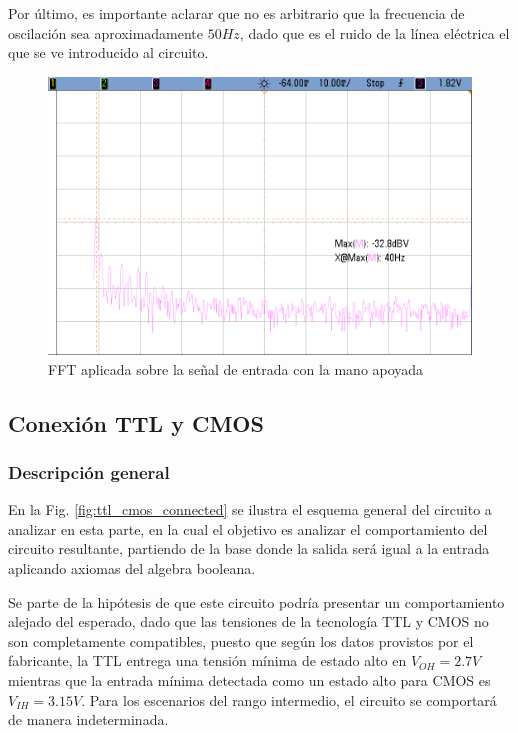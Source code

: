 Por \'ultimo, es importante aclarar que no es arbitrario que la frecuencia de oscilaci\'on sea aproximadamente $50Hz$, dado que es el ruido de la l\'inea el\'ectrica el que se ve introducido al circuito.

\begin{figure}[H]
    \centering
    \includegraphics[scale=0.3]{../EJ5/Mediciones/Osciloscopio/CMOS_OR_SOLA/cropped_fft_ruido_contacto.png}
    \caption{FFT aplicada sobre la se\~nal de entrada con la mano apoyada}
    \label{fig:fft_mediciones}
\end{figure}

\subsection{Conexi\'on TTL y CMOS}

\subsubsection{Descripci\'on general}
En la Fig. \ref{fig:ttl_cmos_connected} se ilustra el esquema general del circuito a analizar en esta parte, en la cual el objetivo es analizar el comportamiento
del circuito resultante, partiendo de la base donde la salida ser\'a igual a la entrada aplicando axiomas del algebra booleana.

Se parte de la hip\'otesis de que este circuito podr\'ia presentar un comportamiento alejado del esperado, dado que las tensiones de la tecnolog\'ia TTL y CMOS no son completamente compatibles,
puesto que seg\'un los datos provistos por el fabricante, la TTL entrega una tensi\'on m\'inima de estado alto en $V_{OH} = 2.7V$ mientras que la entrada m\'inima detectada como un estado alto para
CMOS es $V_{IH} = 3.15V$. Para los escenarios del rango intermedio, el circuito se comportar\'a de manera indeterminada.

